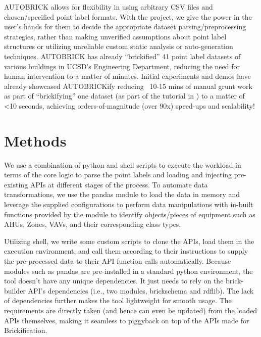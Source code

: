\documentclass[twocolumn, switch]{article} %
\begin{document}
	AUTOBRICK allows for flexibility in using arbitrary CSV files and
    chosen/specified point label formats. With the project, we give the power
    in the user’s hands for them to decide the appropriate dataset
    parsing/preprocessing strategies, rather than making unverified assumptions
    about point label structures or utilizing unreliable custom static analysis
    or auto-generation techniques. AUTOBRICK has already “brickified” 41 point
    label datasets of various buildings in UCSD’s Engineering Department,
    reducing the need for human intervention to a matter of minutes. Initial
    experiments and demos have already showcased AUTOBRICKify reducing ~10-15
    mins of manual grunt work as part of “brickifying” one dataset (as part of
    the tutorial in \cite{gtfierro225_2020}) to a matter of <10 seconds, 
    achieving orders-of-magnitude (over 90x) speed-ups and scalability!

\section{Methods}
We use a combination of python and shell scripts to execute the workload in terms of the core logic to parse the point labels and loading and injecting pre-existing APIs at different stages of the process.  
To automate data transformations, we use the pandas module to load the data in memory and leverage the supplied configurations to perform data manipulations with in-built functions provided by the module to identify objects/pieces of equipment such as AHUs, Zones, VAVs, and their corresponding class types. 

	Utilizing shell, we write some custom scripts to clone the APIs, load them in the execution environment, and call them according to their instructions to supply the pre-processed data to their API function calls automatically.  
	Because modules such as pandas are pre-installed in a standard python environment, the tool doesn’t have any unique dependencies. It just needs to rely on the brick-builder API’s dependencies (i.e., two modules, brickschema and rdflib). The lack of dependencies further makes the tool lightweight for smooth usage. The requirements are directly taken (and hence can even be updated) from the loaded APIs themselves, making it seamless to piggyback on top of the APIs made for Brickification.
\end{document}
